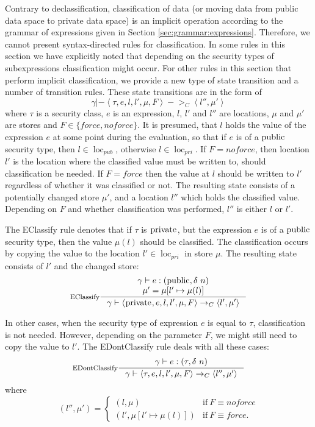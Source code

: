 \documentclass[a4paper, 10pt, draft]{report}
\newcommand{\mycode}[1]{\ensuremath{\mbox{\lstinline{#1}}}}
\begin{document}
Contrary to declassification, classification of data (or moving data from
public data space to private data space) is an implicit operation according
to the grammar of expressions given in Section \ref{sec:grammar:expressions}.
Therefore, we cannot present syntax-directed rules for classification. In some
rules in this section we have explicitly noted that depending on the security
types of subexpressions classification might occur. For other rules in this
section that perform implicit classification, we provide a new type of state
transition and a number of transition rules. These state transitions are in the
form of
\[
  \gamma |- \left\langle
    \tau, e, l, l', \mu, F
  \right\rangle ->_C \left\langle
    l'', \mu'
  \right\rangle
\]
where $\tau$ is a security class, $e$ is an expression, $l$, $l'$ and $l''$ are
locations, $\mu$ and $\mu'$ are stores and $F \in \{force,noforce\}$. It is
presumed, that $l$ holds the value of the expression $e$ at some point during
the evaluation, so that if $e$ is of a \mycode{public} security type, then
$l \in \operatorname{loc}_{pub}$, otherwise $l \in \operatorname{loc}_{pri}$.
If $F = noforce$, then location $l'$ is the location where the classified value
must be written to, should classification be needed. If $F = force$ then the
value at $l$ should be written to $l'$ regardless of whether it was classified
or not. The resulting state consists of a potentially changed store $\mu'$, and
a location $l''$ which holds the classified value. Depending on $F$ and whether
classification was performed, $l''$ is either $l$ or $l'$.


The EClassify rule denotes that if $\tau$ is \mycode{private}, but the
expression $e$ is of a \mycode{public} security type, then the value
$\mu\!\left(l\right)$ should be classified. The classification occurs by
copying the value to the location $l' \in \operatorname{loc}_{pri}$ in store
$\mu$. The resulting state consists of $l'$ and the changed store:
\[ \inference[EClassify]
{
  \gamma |- e : \left(\mycode{public}, \delta\ n \right)  \\ 
  \mu' = \mu[l' \mapsto \mu(l)] 
}{
  \gamma |- \left<\mycode{private}, e, l, l', \mu, F \right> \to_C \left< l', \mu' \right>
} \]

In other cases, when the security type of expression $e$ is equal to $\tau$,
classification is not needed. However, depending on the parameter $F$, we
might still need to copy the value to $l'$. The EDontClassify rule deals
with all these cases:
\[
\inference[EDontClassify]
{
  \gamma |- e : \left(\tau, \delta\ n \right) \\
}{
  \gamma |- \left<\tau, e, l, l', \mu, F \right> \to_C \left<l'', \mu' \right>
} \]
where \[
(l'', \mu') = 
\begin{cases}
(l, \mu) & \text{if}\ F \equiv \textit{noforce} \\
(l', \mu [ l' \mapsto \mu(l)]) & \text{if}\ F \equiv \textit{force}.
\end{cases}
\]
\end{document}
